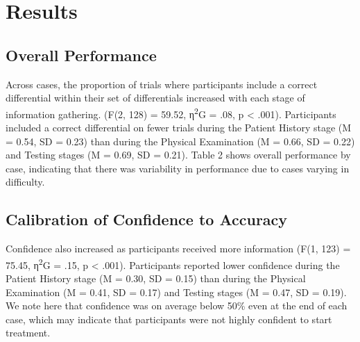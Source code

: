 \documentclass[a4paper, nobind]{templates/ociamthesis}
\begin{document}
\hypertarget{results}{%
\section*{Results}\label{results}}

\hypertarget{overall-performance}{%
\subsection{Overall Performance}\label{overall-performance}}

Across cases, the proportion of trials where participants include a correct differential within their set of differentials increased with each stage of information gathering. (F(2, 128) = 59.52, η\textsuperscript{2}G = .08, p \textless{} .001). Participants included a correct differential on fewer trials during the Patient History stage (M = 0.54, SD = 0.23) than during the Physical Examination (M = 0.66, SD = 0.22) and Testing stages (M = 0.69, SD = 0.21). Table 2 shows overall performance by case, indicating that there was variability in performance due to cases varying in difficulty.

\hypertarget{calibration-of-confidence-to-accuracy}{%
\subsection{Calibration of Confidence to Accuracy}\label{calibration-of-confidence-to-accuracy}}

Confidence also increased as participants received more information (F(1, 123) = 75.45, η\textsuperscript{2}G = .15, p \textless{} .001). Participants reported lower confidence during the Patient History stage (M = 0.30, SD = 0.15) than during the Physical Examination (M = 0.41, SD = 0.17) and Testing stages (M = 0.47, SD = 0.19). We note here that confidence was on average below 50\% even at the end of each case, which may indicate that participants were not highly confident to start treatment.
\end{document}

